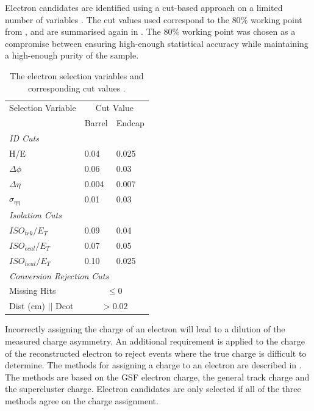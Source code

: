 Electron candidates are identified using a cut-based approach on a limited
number of variables \cite{daskalakis2009data}.  The cut values used correspond
to the $80\%$ working point from , and are summarised
again in . The $80\%$ working point was chosen
as a compromise between ensuring high-enough statistical accuracy while maintaining
a high-enough purity of the sample.

\begin{table}[htbp]
  \begin{center}
    \leavevmode
    \begin{tabular}{lll} 
    \toprule
     Selection Variable & \multicolumn{2}{c}{Cut Value}\\
                        & Barrel & Endcap\\
\midrule 
  \multicolumn{3}{l}{\emph{ID Cuts}}\\
   H/E & 0.04 & 0.025 \\
  $\Delta\phi$ & 0.06 & 0.03 \\
  $\Delta\eta$ & 0.004 & 0.007  \\
  $\sigma_{\eta\eta}$ & 0.01 & 0.03 \\
  \midrule \multicolumn{3}{l}{\emph{Isolation Cuts}}\\
  $ISO_{trk} / E_T $  & 0.09 & 0.04 \\ 
  $ISO_{ecal}/ E_T$  & 0.07 & 0.05 \\
  $ISO_{hcal}/ E_T$  & 0.10 & 0.025 \\ 
  \midrule
   \multicolumn{3}{l}{\emph{Conversion Rejection Cuts}}\\
    Missing Hits  & \multicolumn{2}{c}{$\leq 0$}\\
    Dist (cm) $||$ Dcot   & \multicolumn{2}{c}{$>0.02$}\\
  \bottomrule 
  \end{tabular} 
  \caption[The electron selection variables and corresponding cut values.]
{\label{tab:electronselection}The electron selection variables and corresponding
cut values \cite{simplecutbasedeleid}.} 
  \end{center} 
\end{table}

Incorrectly assigning the charge of an electron will lead to a dilution of the
measured charge asymmetry.  An additional requirement is applied to the charge
of the reconstructed electron to reject events where the true charge is
difficult to determine.  The methods for assigning a charge to an electron are
described in . The methods are based on the GSF electron
charge, the general track charge and the supercluster charge.
Electron candidates are only selected if all of the three methods agree on the
charge assignment.

